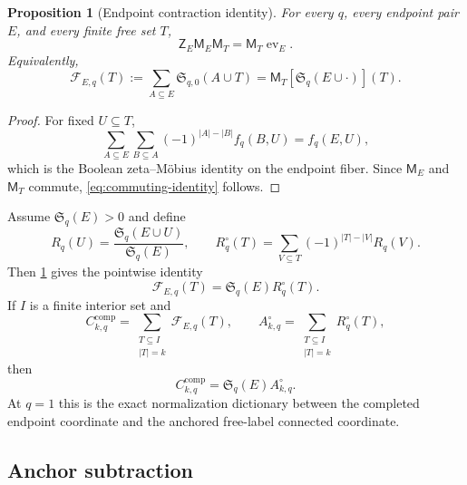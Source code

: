 \documentclass[11pt]{article}
\newtheorem{proposition}[theorem]{Proposition}
\theoremstyle{definition}
\theoremstyle{remark}
\newcommand{\SSer}{\mathfrak S}
\newcommand{\Mob}{\mathsf M}
\newcommand{\ZE}{\mathsf Z_E}
\newcommand{\evE}{\operatorname{ev}_E}
\newcommand{\1}{\mathbf 1}
\newcommand{\Fcal}{\mathcal F}
\begin{document}
\begin{proposition}[Endpoint contraction identity]\label{prop:endpoint-contraction}
For every $q$, every endpoint pair $E$, and every finite free set $T$,
\begin{equation}\label{eq:commuting-identity}
\boxed{\ZE\Mob_E\Mob_T=\Mob_T\evE.}
\end{equation}
Equivalently,
\begin{equation}\label{eq:F_E}
\Fcal_{E,q}(T)
:=\sum_{A\subseteq E}\SSer_{q,0}(A\cup T)
=\Mob_T[\SSer_q(E\cup\cdot)](T).
\end{equation}
\end{proposition}

\begin{proof}
For fixed $U\subseteq T$,
\[
\sum_{A\subseteq E}\sum_{B\subseteq A}
(-1)^{|A|-|B|}f_q(B,U)
=f_q(E,U),
\]
which is the Boolean zeta--M\"obius identity on the endpoint fiber.  Since $\Mob_E$ and $\Mob_T$ commute, \eqref{eq:commuting-identity} follows.
\end{proof}

Assume $\SSer_q(E)>0$ and define
\begin{equation}\label{eq:Rq}
R_q(U)=\frac{\SSer_q(E\cup U)}{\SSer_q(E)},
\qquad
R_q^\circ(T)=\sum_{V\subseteq T}(-1)^{|T|-|V|}R_q(V).
\end{equation}
Then \cref{prop:endpoint-contraction} gives the pointwise identity
\begin{equation}\label{eq:F-Rcirc}
\boxed{\Fcal_{E,q}(T)=\SSer_q(E)R_q^\circ(T).}
\end{equation}
If $I$ is a finite interior set and
\[
C_{k,q}^{\mathrm{comp}}
=\sum_{\substack{T\subseteq I\\|T|=k}}\Fcal_{E,q}(T),
\qquad
A_{k,q}^{\circ}
=\sum_{\substack{T\subseteq I\\|T|=k}}R_q^\circ(T),
\]
then
\begin{equation}\label{eq:C-A-dictionary}
\boxed{C_{k,q}^{\mathrm{comp}}=\SSer_q(E)A_{k,q}^{\circ}.}
\end{equation}
At $q=1$ this is the exact normalization dictionary between the completed endpoint coordinate and the anchored free-label connected coordinate.

\subsection{Anchor subtraction}
\end{document}
